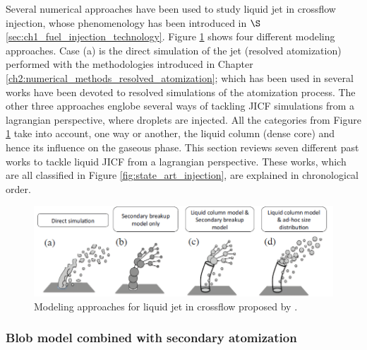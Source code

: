 Several numerical approaches have been used to study liquid jet in crossflow injection, whose phenomenology has been introduced in $\S$\ref{sec:ch1_fuel_injection_technology}. Figure \ref{fig:jaegle_jicf_modeling_approaches} shows four different modeling approaches.  Case (a) is the direct simulation of the jet (resolved atomization) performed with the methodologies introduced in Chapter \ref{ch2:numerical_methods_resolved_atomization}; which has been used in several works   have been devoted to resolved simulations of the atomization process. The other three approaches englobe several ways of tackling JICF simulations from a lagrangian perspective, where droplets are injected. All the categories from Figure \ref{fig:jaegle_jicf_modeling_approaches} take into account, one way or another, the liquid column (dense core) and hence its influence on the gaseous phase. This section reviews seven different past works to tackle liquid JICF from a lagrangian perspective. These works, which are all classified in Figure \ref{fig:state_art_injection}, are explained in chronological order. 

\clearpage

\begin{figure}[ht]
    \centering
    \includegraphics[width=1.0\textwidth]{./part1_numerical_approaches/figures_ch3/modelling_approaches_JICF_Jaegle}
       \centering
    \caption{Modeling approaches for liquid jet in crossflow proposed by .}
    \label{fig:jaegle_jicf_modeling_approaches}
\end{figure}


\subsubsection*{Blob model combined with secondary atomization }



